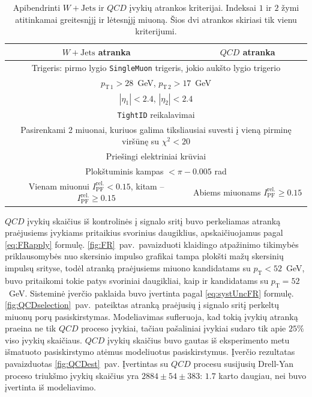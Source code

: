 \documentclass[a4paper, 12pt, oneside]{article}
\newcommand{\ttt}[1]{\texttt{#1}}
\newcommand{\pT}{p_{\mathrm{T}}}
\newcommand{\WJets}{W\! +\!\mathrm{Jets}}
\newcommand{\QCD}{QC\! D}
\newlength\q
\begin{document}
\begin{table}[b!]
	\begin{tabular}{|c|c|}
		\hline
		\textbf{$\WJets$ atranka} & \textbf{$\QCD$ atranka} \\
		\hline\hline
		\multicolumn{2}{|c|}{Trigeris: pirmo lygio \ttt{SingleMuon} trigeris, jokio aukšto lygio trigerio} \\
		\hline
		\multicolumn{2}{|c|}{$p_{\mathrm{T \, 1}} > 28$~GeV, $p_{\mathrm{T \, 2}} > 17$~GeV} \\
		\hline
		\multicolumn{2}{|c|}{$|\eta_1| < 2.4$, $|\eta_2| < 2.4$} \\
		\hline
		\multicolumn{2}{|c|}{\ttt{TightID} reikalavimai} \\
		\hline
		\multicolumn{2}{|c|}{\multirow{2}{37em}{\centering Pasirenkami 2 miuonai, kuriuos galima tiksliausiai suvesti į vieną
		pirminę viršūnę su $\chi^2<20$}} \\
		\multicolumn{2}{|c|}{} \\
		\hline
		\multicolumn{2}{|c|}{Priešingi elektriniai krūviai} \\
		\hline
		\multicolumn{2}{|c|}{Plokštuminis kampas $< \pi - 0.005$ rad} \\
		\hline
		\multirow{1}{22em}{\centering Vienam miuonui $I_{\mathrm{PF}}^{\mathrm{rel.}}<0.15$,
			kitam -- $I_{\mathrm{PF}}^{\mathrm{rel.}}\geqslant 0.15$} &
			\multirow{1}{15em}{\centering Abiems miuonams $I_{\mathrm{PF}}^{\mathrm{rel.}}\geqslant 0.15$} \\
		\hline
	\end{tabular}
	\caption{\label{table:jetSelection}Apibendrinti $\WJets$ ir $\QCD$ įvykių atrankos kriterijai. Indeksai $1$ ir $2$ žymi
	atitinkamai greitesnįjį ir lėtesnįjį miuoną. Šios dvi atrankos skiriasi tik vienu kriterijumi.}
\end{table}

$\QCD$ įvykių skaičius iš kontrolinės į signalo sritį buvo perkeliamas atranką praėjusiems įvykiams pritaikius svorinius
daugiklius, apskaičiuojamus pagal \ref{eq:FRapply} formulę.
\ref{fig:FR}~pav.\ pavaizduoti klaidingo atpažinimo tikimybės priklausomybės nuo skersinio impulso grafikai tampa
plokšti mažų skersinių impulsų srityse, todėl atranką praėjusiems miuono kandidatams su $\pT<52$~GeV, buvo pritaikomi
tokie patys svoriniai daugikliai, kaip ir kandidatams su $\pT=52$~GeV.
Sisteminė įverčio paklaida buvo įvertinta pagal \ref{eq:systUncFR} formulę.
\ref{fig:QCDselection}~pav.\ pateiktas atranką praėjusių į signalo sritį perkeltų miuonų porų pasiskirstymas.
Modeliavimas sufleruoja, kad tokią įvykių atranką praeina ne tik $\QCD$ proceso įvykiai, tačiau pašaliniai įvykiai
sudaro tik apie $25\%$ viso įvykių skaičiaus.
$\QCD$ įvykių skaičius buvo gautas iš eksperimento metu išmatuoto pasiskirstymo atėmus modeliuotus pasiskirstymus.
Įverčio rezultatas pavaizduotas \ref{fig:QCDest}~pav.
Įvertintas su $\QCD$ procesu susijusių Drell-Yan proceso triukšmo įvykių skaičius yra $2884\pm 54 \pm 383$:
$1.7$ karto daugiau, nei buvo įvertinta iš modeliavimo.
\end{document}
